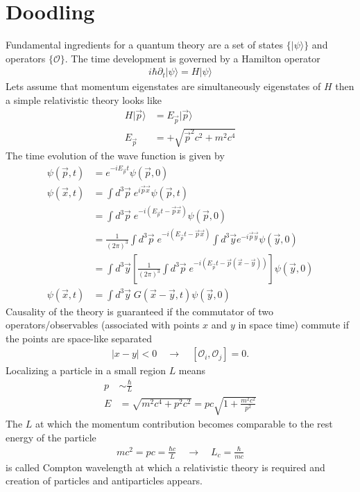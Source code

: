 \documentclass[10pt,a4paper]{article}
\theoremstyle{definition}
\begin{document}
\section{Doodling}
Fundamental ingredients for a quantum theory are a set of states $\{|\psi\rangle\}$ and operators $\{\mathcal{O}\}$. The time development is governed by a Hamilton operator
\begin{align}
    i\hbar\partial_t|\psi\rangle=H|\psi\rangle
\end{align}
Lets assume that momentum eigenstates are simultaneously eigenstates of $H$ then a simple relativistic theory looks like
\begin{align}
    H|\vec{p}\rangle&= E_{\vec{p}}|\vec{p}\rangle\\
    E_{\vec{p}}&=+\sqrt{\vec{p}^2c^2+m^2c^4}
\end{align}
The time evolution of the wave function is given by
\begin{align}
    \psi(\vec{p},t) &= e^{-iE_{\vec{p}} t} \psi(\vec{p},0)\\
    \psi(\vec{x},t) &= \int d^3\vec{p}\;e^{i\vec{p}\vec{x}}\psi(\vec{p},t)\\
    &=\int d^3\vec{p}\;e^{-i(E_{\vec{p}} t-\vec{p}\vec{x})}\psi(\vec{p},0)\\
    &=\frac{1}{(2\pi)^3}\int d^3\vec{p}\;e^{-i(E_{\vec{p}} t-\vec{p}\vec{x})}\int d^3\vec{y}e^{-i\vec{p}\vec{y}}\psi(\vec{y},0)\\
    &=\int d^3\vec{y}\left[\frac{1}{(2\pi)^3}\int d^3\vec{p}\;e^{-i(E_{\vec{p}} t-\vec{p}(\vec{x}-\vec{y}))}\right]\psi(\vec{y},0)\\
    \psi(\vec{x},t) &= \int d^3\vec{y}\;G(\vec{x}-\vec{y},t) \psi(\vec{y},0)
\end{align}
Causality of the theory is guaranteed if the commutator of two operators/observables (associated with points $x$ and $y$ in space time) commute if the points are space-like separated
\begin{align}
    |x-y|<0\quad\rightarrow\quad [\mathcal{O}_i,\mathcal{O}_j]=0.
\end{align}
Localizing a particle in a small region $L$ means
\begin{align}
    p&\sim\frac{\hbar}{L}\\
    E&=\sqrt{m^2c^4+p^2c^2}= pc\sqrt{1+\frac{m^2c^2}{p^2}}
\end{align}
The $L$ at which the momentum contribution becomes comparable to the rest energy of the particle
\begin{align}
    mc^2=pc = \frac{\hbar c}{L}\quad\rightarrow\quad L_c=\frac{\hbar}{mc}
\end{align}
is called Compton wavelength at which a relativistic theory is required and creation of particles and antiparticles appears.
\end{document}
